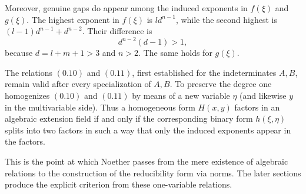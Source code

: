 \documentclass[11pt]{article}
\begin{document}
Moreover, genuine gaps do appear among the induced exponents in $f(\xi)$ and $g(\xi)$. The highest exponent in $f(\xi)$ is $l d^{n-1}$, while the second highest is $(l-1)d^{n-1}+d^{n-2}$. Their difference is
\[
d^{n-2}(d-1)>1,
\]
because $d=l+m+1>3$ and $n>2$. The same holds for $g(\xi)$.

The relations \((0.10)\) and \((0.11)\), first established for the indeterminates $A,B$, remain valid after every specialization of $A,B$. To preserve the degree one homogenizes \((0.10)\) and \((0.11)\) by means of a new variable $\eta$ (and likewise $y$ in the multivariable side). Thus a homogeneous form $H(x,y)$ factors in an algebraic extension field if and only if the corresponding binary form $h(\xi,\eta)$ splits into two factors in such a way that only the induced exponents appear in the factors.

This is the point at which Noether passes from the mere existence of algebraic relations to the construction of the reducibility form via norms. The later sections produce the explicit criterion from these one-variable relations.
\end{document}
